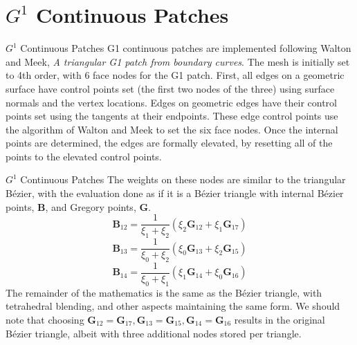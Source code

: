 \documentclass[12pt]{beamer}
\begin{document}
\section{$G^1$ Continuous Patches}
\begin{frame}{$G^1$ Continuous Patches}
G1 continuous patches are implemented following Walton and Meek, \textit{A triangular G1 patch from boundary curves}. The mesh is initially set to 4th order, with 6 face nodes for the G1 patch. First, all edges on a geometric surface have control points set (the first two nodes of the three) using surface normals and the vertex locations. Edges on geometric edges have their control points set using the tangents at their endpoints. These edge control points use the algorithm of Walton and Meek to set the six face nodes. Once the internal points are determined, the edges are formally elevated, by resetting all of the points to the elevated control points.
\end{frame}
\begin{frame}{$G^1$ Continuous Patches}
The weights on these nodes are similar to the triangular B{\'e}zier, with the evaluation done as if it is a B{\'e}zier triangle with internal B{\'e}zier points, $\mathbf{B}$, and Gregory points, $\mathbf{G}$.
\begin{equation}
\mathbf{B}_{12} = \frac{1}{\xi_1+\xi_2}(\xi_2\mathbf{G}_{12}+\xi_1\mathbf{G}_{17})
\end{equation}
\begin{equation}
\mathbf{B}_{13} = \frac{1}{\xi_0+\xi_2}(\xi_0\mathbf{G}_{13}+\xi_2\mathbf{G}_{15})
\end{equation}
\begin{equation}
\mathbf{B}_{14} = \frac{1}{\xi_0+\xi_1}(\xi_1\mathbf{G}_{14}+\xi_0\mathbf{G}_{16})
\end{equation}
The remainder of the mathematics is the same as the B{\'e}zier triangle, with tetrahedral blending, and other aspects maintaining the same form. We should note that choosing $\mathbf{G}_{12} = \mathbf{G}_{17}, \mathbf{G}_{13} = \mathbf{G}_{15}, \mathbf{G}_{14} = \mathbf{G}_{16}$ results in the original B{\'e}zier triangle, albeit with three additional nodes stored per triangle.
\end{frame}
\end{document}
